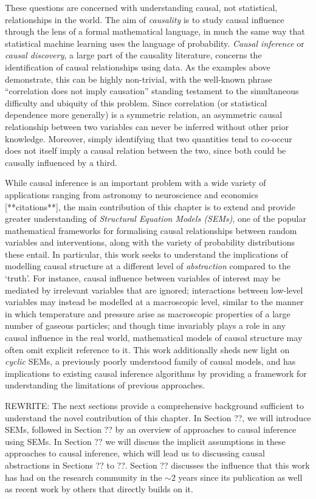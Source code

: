 These questions are concerned with understanding causal, not statistical, relationships in the world. 
The aim of \emph{causality} is to study causal influence through the lens of a formal mathematical language, in much the same way that statistical machine learning uses the language of probability. 
\emph{Causal inference} or \emph{causal discovery}, a large part of the causality literature, concerns the identification of causal relationships using data.
As the examples above demonstrate, this can be highly non-trivial, with the well-known phrase ``correlation does not imply causation'' standing testament to the simultaneous difficulty and ubiquity of this problem.
Since correlation (or statistical dependence more generally) is a symmetric relation, an asymmetric causal relationship between two variables can never be inferred without other prior knowledge. 
Moreover, simply identifying that two quantities tend to co-occur does not itself imply a causal relation between the two, since both could be causally influenced by a third.

While causal inference is an important problem with a wide variety of applications ranging from astronomy to neuroscience and economics [**citations**], the main contribution of this chapter is to extend and provide greater understanding of \emph{Structural Equation Models (SEMs)}, one of the popular mathematical frameworks for formalising causal relationships between random variables and interventions, along with the variety of probability distributions these entail. 
In particular, this work seeks to understand the implications of modelling causal structure at a different level of \emph{abstraction} compared to the `truth'. For instance, causal influence between variables of interest may be mediated by irrelevant variables that are ignored; interactions between low-level variables may instead be modelled at a macroscopic level, similar to the manner in which temperature and pressure arise as macroscopic properties of a large number of gaseous particles; and though time invariably plays a role in any causal influence in the real world, mathematical models of causal structure may often omit explicit reference to it.
This work additionally sheds new light on \emph{cyclic} SEMs, a previously poorly understood family of causal models, and has implications to existing causal inference algorithms by providing a framework for understanding the limitations of previous approaches.

REWRITE:
The next sections provide a comprehensive background sufficient to understand the novel contribution of this chapter.
In Section ??, we will introduce SEMs, followed in Section ?? by an overview of approaches to causal inference using SEMs. 
In Section ?? we will discuss the implicit assumptions in these approaches to causal inference, which will lead us to discussing causal abstractions in Sections ?? to ??.
Section ?? discusses the influence that this work has had on the research community in the $\sim 2$ years since its publication as well as recent work by others that directly builds on it.

